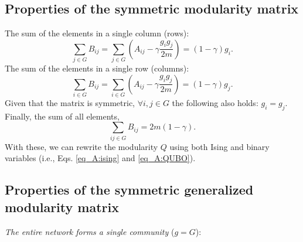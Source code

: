 \documentclass[pdflatex,sn-mathphys-num]{sn-jnl}%
\begin{document}
\subsection{Properties of the symmetric modularity matrix}
The sum of the elements in a single column (rows):
\begin{equation}\label{eq_A:sym_und_rows}
    \sum_{j \in G}B_{ij} = \sum_{j \in G}\left( A_{ij} - \gamma \frac{g_i g_j}{2m}\right) = (1 - \gamma)g_i.
\end{equation}
The sum of the elements in a single row (columns):
\begin{equation}\label{eq_A:sym_und_cols}
    \sum_{i \in G}B_{ij} = \sum_{i \in G}\left( A_{ij} - \gamma \frac{g_i g_j}{2m}\right) = (1 - \gamma)g_j.
\end{equation}
Given that the matrix is symmetric, $\forall i,j \in G$ the following also holds: $g_i=g_j$. Finally, the sum of all elements,
\begin{equation} \label{eq_A:sym_und_elements}
    \sum_{ij \in G}B_{ij} = 2m(1-\gamma).
\end{equation} With these, we can rewrite the modularity $Q$ using both Ising and binary variables (i.e., Eqs. \ref{eq_A:ising} and \ref{eq_A:QUBO}).

\subsection{Properties of the symmetric generalized modularity matrix}

\textit{The entire network forms a single community }($g=G$):
\end{document}
